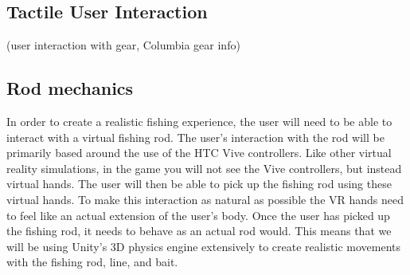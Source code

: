 \documentclass[10pt,journal,compsoc,onecolumn, draftclsnofoot]{IEEEtran}
\begin{document}
\subsection{Tactile User Interaction}
(user interaction with gear, Columbia gear info)

\subsection{Rod mechanics}
In order to create a realistic fishing experience, the user will need to be able to interact with a virtual fishing rod.
The user's interaction with the rod will be primarily based around the use of the HTC Vive controllers.
Like other virtual reality simulations, in the game you will not see the Vive controllers, but instead virtual hands.
The user will then be able to pick up the fishing rod using these virtual hands.
To make this interaction as natural as possible the VR hands need to feel like an actual extension of the user's body.
Once the user has picked up the fishing rod, it needs to behave as an actual rod would.
This means that we will be using Unity's 3D physics engine extensively to create realistic movements with the fishing rod, line, and bait.

% 
% 
\end{document}
